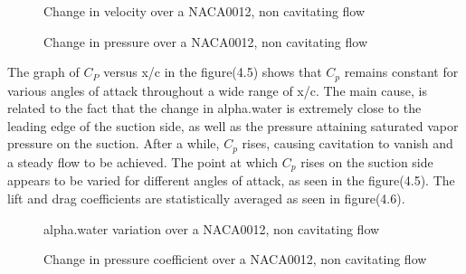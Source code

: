 \begin{figure}[H]
    \centering
    \qquad
   \qquad
      \caption{Change in velocity over a NACA0012, non cavitating flow}
    \label{fig:fig16}
\end{figure}
 \begin{figure}[H]
    \centering
    \qquad
   \qquad
      \caption{Change in pressure over a NACA0012, non cavitating flow}
    \label{fig:fig16}
\end{figure}
The graph of $C_P$ versus x/c in the figure(4.5) shows that $C_p$ remains constant for various angles of attack throughout a wide range of x/c.
The main cause, is related to the fact that the change in alpha.water is extremely close to the leading edge of 
the suction side, as well as the pressure attaining saturated vapor pressure on the suction.
After a while, $C_p$ rises, causing cavitation to vanish and a steady flow to be achieved.
The point at which $C_p$ rises on the suction side appears to be varied for different angles of attack, as seen in the figure(4.5). 
The lift and drag coefficients are statistically averaged as seen in figure(4.6).
  \begin{figure}[H]
    \centering
    \qquad
   \qquad
      \caption{alpha.water variation over a NACA0012, non cavitating flow}
    \label{fig:fig16}
\end{figure}
 \begin{figure}[H]
    \centering
    \qquad
   \qquad
      \caption{Change in pressure coefficient over a NACA0012, non cavitating flow}
    \label{fig:fig16}
\end{figure} 
  
